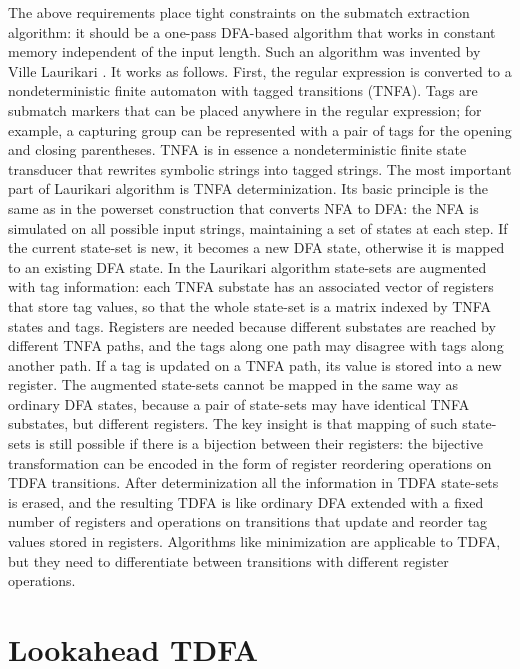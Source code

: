 \documentclass[preprint,12pt, a4paper]{elsarticle}
\begin{document}
\noindent
The above requirements place tight constraints on the submatch extraction algorithm:
it should be a one-pass DFA-based algorithm that works in constant memory independent of the input length.
Such an algorithm was invented by Ville Laurikari \cite{Lau00}.
It works as follows.
First, the regular expression is converted to a nondeterministic finite automaton with tagged transitions (TNFA).
Tags are submatch markers that can be placed anywhere in the regular expression;
for example, a capturing group can be represented with a pair of tags for the opening and closing parentheses.
TNFA is in essence a nondeterministic finite state transducer that rewrites symbolic strings into tagged strings.
The most important part of Laurikari algorithm is TNFA determinization.
Its basic principle is the same as in the powerset construction that converts NFA to DFA:
the NFA is simulated on all possible input strings, maintaining a set of states at each step.
If the current state-set is new, it becomes a new DFA state, otherwise it is mapped to an existing DFA state.
In the Laurikari algorithm state-sets are augmented with tag information:
each TNFA substate has an associated vector of registers that store tag values,
so that the whole state-set is a matrix indexed by TNFA states and tags.
Registers are needed because different substates are reached by different TNFA paths,
and the tags along one path may disagree with tags along another path.
If a tag is updated on a TNFA path, its value is stored into a new register.
The augmented state-sets cannot be mapped in the same way as ordinary DFA states,
because a pair of state-sets may have identical TNFA substates, but different registers.
The key insight is that mapping of such state-sets is still possible if there is a bijection between their registers:
the bijective transformation can be encoded in the form of register reordering operations on TDFA transitions.
After determinization all the information in TDFA state-sets is erased,
and the resulting TDFA is like ordinary DFA extended with a fixed number of registers
and operations on transitions that update and reorder tag values stored in registers.
Algorithms like minimization are applicable to TDFA,
but they need to differentiate between transitions with different register operations.

\section{Lookahead TDFA}
\end{document}
